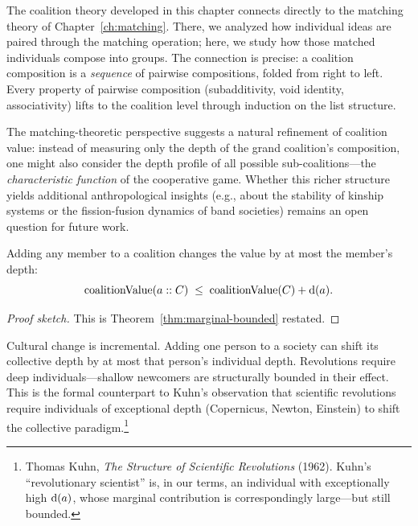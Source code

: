 \begin{remark}
\label{rem:matching-connection}
The coalition theory developed in this chapter connects directly to the
matching theory of Chapter~\ref{ch:matching}.  There, we analyzed how
individual ideas are paired through the matching operation; here, we
study how those matched individuals compose into groups.  The connection
is precise: a coalition composition is a \emph{sequence} of pairwise
compositions, folded from right to left.  Every property of pairwise
composition (subadditivity, void identity, associativity) lifts to the
coalition level through induction on the list structure.

The matching-theoretic perspective suggests a natural refinement of
coalition value: instead of measuring only the depth of the grand
coalition's composition, one might also consider the depth profile of all
possible sub-coalitions---the \emph{characteristic function} of the
cooperative game.  Whether this richer structure yields additional
anthropological insights (e.g., about the stability of kinship systems
or the fission-fusion dynamics of band societies) remains an open question
for future work.
\end{remark}

\begin{theorem}
\label{thm:value-mono}
Adding any member to a coalition changes the value by at most the member's
depth:
\[
  \operatorname{coalitionValue}(a :: C) \;\le\;
  \operatorname{coalitionValue}(C) + \operatorname{d}(a).
\]
\end{theorem}

\begin{proof}[Proof sketch]
This is Theorem~\ref{thm:marginal-bounded} restated.
\end{proof}

Cultural change is incremental.  Adding one person to a society can shift its
collective depth by at most that person's individual depth.  Revolutions
require deep individuals---shallow newcomers are structurally bounded in
their effect.  This is the formal counterpart to Kuhn's observation that
scientific revolutions require individuals of exceptional depth (Copernicus,
Newton, Einstein) to shift the collective paradigm.\footnote{Thomas Kuhn,
\textit{The Structure of Scientific Revolutions} (1962).  Kuhn's
``revolutionary scientist'' is, in our terms, an individual with
exceptionally high $\operatorname{d}(a)$, whose marginal contribution is correspondingly
large---but still bounded.}

